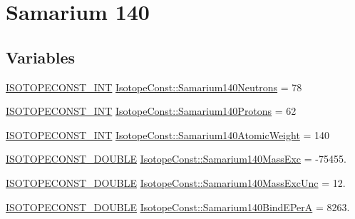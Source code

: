 \hypertarget{group___isotope_const-_samarium-_sm140}{}\section{Samarium 140}
\label{group___isotope_const-_samarium-_sm140}
\subsection*{Variables}
\begin{DoxyCompactItemize}
\item 
\mbox{\hyperlink{group___isotope_const-_macros_ga5f18360b3e99483a35c32d789e62621c}{I\+S\+O\+T\+O\+P\+E\+C\+O\+N\+S\+T\+\_\+\+I\+NT}} \mbox{\hyperlink{group___isotope_const-_samarium-_sm140_ga7ca9931a980b0b68196afef9f2972268}{Isotope\+Const\+::\+Samarium140\+Neutrons}} = 78
\item 
\mbox{\hyperlink{group___isotope_const-_macros_ga5f18360b3e99483a35c32d789e62621c}{I\+S\+O\+T\+O\+P\+E\+C\+O\+N\+S\+T\+\_\+\+I\+NT}} \mbox{\hyperlink{group___isotope_const-_samarium-_sm140_ga652611c642fb2a06ed070c67fb635d49}{Isotope\+Const\+::\+Samarium140\+Protons}} = 62
\item 
\mbox{\hyperlink{group___isotope_const-_macros_ga5f18360b3e99483a35c32d789e62621c}{I\+S\+O\+T\+O\+P\+E\+C\+O\+N\+S\+T\+\_\+\+I\+NT}} \mbox{\hyperlink{group___isotope_const-_samarium-_sm140_gabfcd9d093edf084a06b35dc354c4f2a0}{Isotope\+Const\+::\+Samarium140\+Atomic\+Weight}} = 140
\item 
\mbox{\hyperlink{group___isotope_const-_macros_ga8f45a7272ce02c0b4c65c44636ed719a}{I\+S\+O\+T\+O\+P\+E\+C\+O\+N\+S\+T\+\_\+\+D\+O\+U\+B\+LE}} \mbox{\hyperlink{group___isotope_const-_samarium-_sm140_ga3e726a9e4e7bec13e74bb5f714ec3278}{Isotope\+Const\+::\+Samarium140\+Mass\+Exc}} = -\/75455.
\item 
\mbox{\hyperlink{group___isotope_const-_macros_ga8f45a7272ce02c0b4c65c44636ed719a}{I\+S\+O\+T\+O\+P\+E\+C\+O\+N\+S\+T\+\_\+\+D\+O\+U\+B\+LE}} \mbox{\hyperlink{group___isotope_const-_samarium-_sm140_gafcd3de8a1d22db25098b58f444b24f30}{Isotope\+Const\+::\+Samarium140\+Mass\+Exc\+Unc}} = 12.
\item 
\mbox{\hyperlink{group___isotope_const-_macros_ga8f45a7272ce02c0b4c65c44636ed719a}{I\+S\+O\+T\+O\+P\+E\+C\+O\+N\+S\+T\+\_\+\+D\+O\+U\+B\+LE}} \mbox{\hyperlink{group___isotope_const-_samarium-_sm140_ga9bbc37ed45b0345ac2de62a414617c07}{Isotope\+Const\+::\+Samarium140\+Bind\+E\+PerA}} = 8263.
\item 

\end{DoxyCompactItemize}
